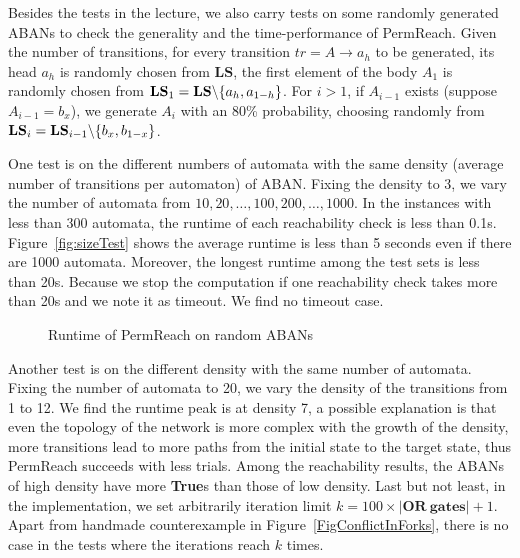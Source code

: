 \documentclass{article}
\theoremstyle{definition}
\DeclarePairedDelimiter{\miset}{\setminus\{}{\}}
\begin{document}
Besides the tests in the lecture, we also carry tests on some randomly generated ABANs to check the generality and the time-performance of PermReach. 
Given the number of transitions, for every transition $tr=A\to a_h$ to be generated, its head $a_h$ is randomly chosen from $\mathbf{LS}$, the first element of the body $A_1$ is randomly chosen from $\mathbf{LS}_1=\mathbf{LS}\miset{a_h,a_{1-h}}$.
For $i>1$, if $A_{i-1}$ exists (suppose $A_{i-1}=b_x$), we generate $A_i$ with an 80\% probability, choosing randomly from $\mathbf{LS}_i=\mathbf{LS}_{i-1}\miset{b_x,b_{1-x}}$. 
 
One test is on the different numbers of automata with the same density (average number of transitions per automaton) of ABAN. Fixing the density to 3, we vary the number of automata from $10,20,\ldots,100,200,\ldots,1000$.
In the instances with less than 300 automata, the runtime of each reachability check is less than 0.1s.
Figure~\ref{fig:sizeTest} shows the average runtime is less than 5 seconds even if there are 1000 automata. 
Moreover, the longest runtime among the test sets is less than 20s. 
Because we stop the computation if one reachability check takes more than 20s and we note it as timeout.
We find no timeout case.
\begin{figure}[ht]
    \caption{Runtime of PermReach on random ABANs}
\end{figure}
Another test is on the different density with the same number of automata. 
Fixing the number of automata to 20, we vary the density of the transitions from 1 to 12.
We find the runtime peak is at density 7, a possible explanation is that even the topology of the network is more complex with the growth of the density, more transitions lead to more paths from the initial state to the target state, thus PermReach succeeds with less trials.
Among the reachability results, the ABANs of high density have more \textbf{True}s than those of low density.
Last but not least, in the implementation, we set arbitrarily iteration limit $k=100\times|\mathbf{OR\  gates}|+1$. 
Apart from handmade counterexample in Figure~\ref{FigConflictInForks}, there is no case in the tests where the iterations reach $k$ times.
\end{document}
